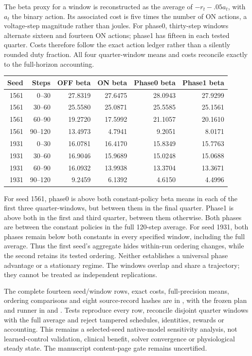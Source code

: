 The beta proxy for a window is reconstructed as the average of $-r_t-.05a_t$, with $a_t$ the binary action. Its associated cost is five times the number of ON actions, a voltage-step magnitude rather than joules. For phase0, thirty-step windows alternate sixteen and fourteen ON actions; phase1 has fifteen in each tested quarter. Costs therefore follow the exact action ledger rather than a silently rounded duty fraction. All four quarter-window means and costs reconcile exactly to the full-horizon accounting.

\begin{center}
\begin{tabular}{rrrrrr}
\toprule
Seed & Steps & OFF beta & ON beta & Phase0 beta & Phase1 beta\\
\midrule
1561 & 0--30 & 27.8319 & 27.6475 & 28.0943 & 27.9299\\
1561 & 30--60 & 25.5580 & 25.0871 & 25.5585 & 25.1561\\
1561 & 60--90 & 19.2720 & 17.5992 & 21.1057 & 20.1610\\
1561 & 90--120 & 13.4973 & 4.7941 & 9.2051 & 8.0171\\
1931 & 0--30 & 16.0781 & 16.4170 & 15.8349 & 15.7763\\
1931 & 30--60 & 16.9046 & 15.9689 & 15.0248 & 15.0688\\
1931 & 60--90 & 16.0932 & 13.9938 & 13.3704 & 13.3671\\
1931 & 90--120 & 9.2459 & 6.1392 & 4.6150 & 4.4996\\
\bottomrule
\end{tabular}
\end{center}

For seed 1561, phase0 is above both constant-policy beta means in each of the first three quarter-windows, but between them in the final quarter. Phase1 is above both in the first and third quarter, between them otherwise. Both phases are between the constant policies in the full 120-step average. For seed 1931, both phases remain below both constants in every specified window, including the full average. Thus the first seed's aggregate hides within-run ordering changes, while the second retains its tested ordering. Neither establishes a universal phase advantage or a stationary regime. The windows overlap and share a trajectory; they cannot be treated as independent replications.

The complete fourteen seed/window rows, exact costs, full-precision means, ordering comparisons and eight source-record hashes are in , with the frozen plan and runner in  and . Tests reproduce every row, reconcile disjoint quarter windows with the full average and reject tampered schedules, identities, rewards or accounting. This remains a selected-seed native-model sensitivity analysis, not learned-control validation, clinical benefit, solver convergence or physiological steady state. The manuscript content-page gate remains uncertified.


